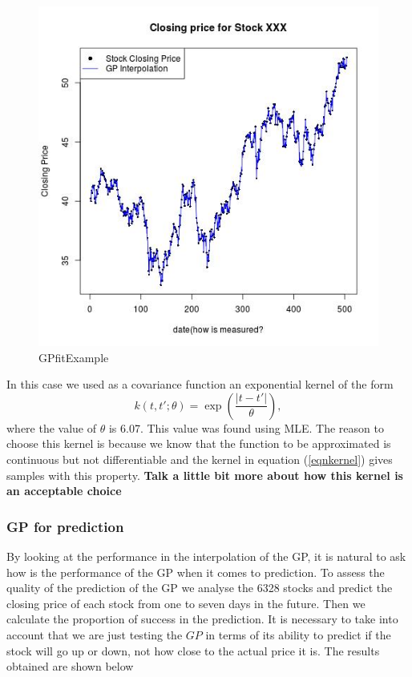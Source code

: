 \documentclass{article}
\begin{document}
\begin{figure}[H]
\centering
\includegraphics[scale=0.4]{../Algorithms/Juan/figures/GPFitExample}
\caption{GPfitExample}
\end{figure}

In this case we used as a covariance function an exponential kernel of the form
\begin{equation}\label{eqnkernel}
k(t,t';\theta)=\exp\left(\frac{|t-t'|}{\theta}\right),
\end{equation}
where the value of $\theta$ is 6.07. This value was found using MLE. The reason to choose this kernel 
is because we know that the function to be approximated is continuous but not differentiable and
the kernel in equation (\ref{eqnkernel}) gives samples with this property. 
\textbf{Talk a little bit more about how this kernel is an acceptable choice}

\subsubsection*{GP for prediction}
By looking at the performance in the interpolation of the GP, it is natural to ask how
is the performance of the GP when it comes to prediction. To assess the quality of the prediction
of the GP we analyse the 6328 stocks and predict the closing price of each stock from one to seven days
in the future. Then we calculate the proportion of success in the prediction. It is necessary to take
into account that we are just testing the $GP$ in terms of its ability to predict if the stock
will go up or down, not how close to the actual price it is. The results obtained are shown below
\end{document}

